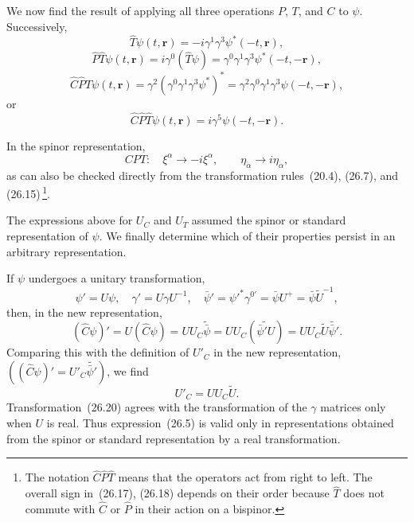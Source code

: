We now find the result of applying all three operations $P$, $T$, and $C$ to $\psi$. Successively,
\[
\widehat T\psi(t,\mathbf{r}) = -i\gamma^1\gamma^3\psi^*(-t,\mathbf{r}),
\]
\[
\widehat P\widehat T\psi(t,\mathbf{r}) = i\gamma^0(\widehat T\psi) = \gamma^0\gamma^1\gamma^3\psi^*(-t,-\mathbf{r}),
\]
\[
\widehat C\widehat P\widehat T\psi(t,\mathbf{r}) = \gamma^2(\gamma^0\gamma^1\gamma^3\psi^*)^* = \gamma^2\gamma^0\gamma^1\gamma^3\psi(-t,-\mathbf{r}),
\]
or
\begin{equation}
\widehat C\widehat P\widehat T\psi(t,\mathbf{r}) = i\gamma^5\psi(-t,-\mathbf{r}).
\tag{26.17}
\end{equation}

In the spinor representation,
\begin{equation}
CPT:\quad \xi^\alpha \to -i\xi^\alpha,\qquad \eta_{\dot\alpha} \to i\eta_{\dot\alpha},
\tag{26.18}
\end{equation}
as can also be checked directly from the transformation rules~(20.4), (26.7), and (26.15)\,\footnote{The notation $\widehat C\widehat P\widehat T$ means that the operators act from right to left. The overall sign in~(26.17), (26.18) depends on their order because $\widehat T$ does not commute with $\widehat C$ or $\widehat P$ in their action on a bispinor.}.

The expressions above for $U_C$ and $U_T$ assumed the spinor or standard representation of $\psi$. We finally determine which of their properties persist in an arbitrary representation.

If $\psi$ undergoes a unitary transformation,
\begin{equation}
\psi' = U\psi,\quad \gamma' = U\gamma U^{-1},\quad \bar\psi' = \psi'^*\gamma^{0\prime} = \bar\psi U^+ = \bar\psi\widetilde U^{-1},
\tag{26.19}
\end{equation}
then, in the new representation,
\[
(\widehat C\psi)' = U(\widehat C\psi) = UU_C\widetilde{\bar\psi} = UU_C(\widetilde{\bar\psi'U}) = UU_C\widetilde U\widetilde{\bar\psi'}.
\]
Comparing this with the definition of $U'_C$ in the new representation, $((\widehat C\psi)' = U'_C\widetilde{\bar\psi'})$, we find
\begin{equation}
U'_C = UU_C\widetilde U.
\tag{26.20}
\end{equation}
Transformation~(26.20) agrees with the transformation of the $\gamma$ matrices only when $U$ is real. Thus expression~(26.5) is valid only in representations obtained from the spinor or standard representation by a real transformation.

